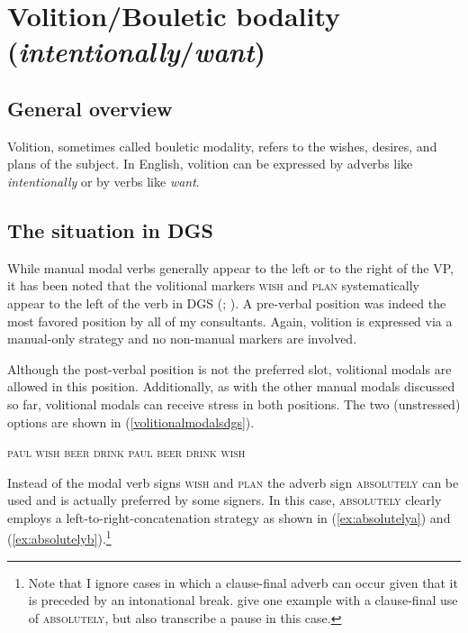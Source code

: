 \section{Volition/Bouletic bodality (\textit{intentionally}/\textit{want})}\label{volition}
\subsection{General overview}
Volition, sometimes called bouletic modality, refers to the wishes, desires, and plans of the subject. In English, volition can be expressed by adverbs like \textit{intentionally} or by verbs like \textit{want}.

\subsection{The situation in DGS}


While manual modal verbs generally appear to the left or to the right of the VP, it has been noted that the volitional markers \textsc{wish} and \textsc{plan} systematically appear to the left of the verb in DGS (\citealt[326]{happ2014vork}; \citealt[20]{bross2017scope}). A pre-verbal position was indeed the most favored position by all of my consultants. Again, volition is expressed via a manual-only strategy and no non-manual markers are involved. 

Although the post-verbal position is not the preferred slot, volitional modals are allowed in this position. Additionally, as with the other manual modals discussed so far, volitional modals can receive stress in both positions. The two (unstressed) options are shown in (\ref{volitionalmodalsdgs}).

\begin{exe}
\ex\label{volitionalmodalsdgs}\begin{xlist}
\ex \textsc{paul wish beer drink} 
\ex \textsc{paul beer drink wish} 
\end{xlist}
\end{exe}

\noindent Instead of the modal verb signs \textsc{wish} and \textsc{plan} the adverb sign \textsc{absolutely} can be used and is actually preferred by some signers. In this case, \textsc{absolutely} clearly employs a left-to-right-concatenation strategy as shown in (\ref{ex:absolutelya}) and (\ref{ex:absolutelyb}).\footnote{ Note that I ignore cases in which a clause-final adverb can occur given that it is preceded by an intonational break. \citet[283]{happ2014vork} give one example with a clause-final use of \textsc{absolutely}, but also transcribe a pause in this case. } 

